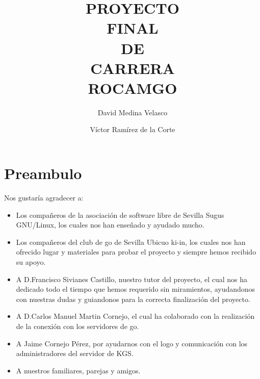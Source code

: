 \documentclass[12pt,a4paper]{report}
\begin{document}

\title{PROYECTO\\ FINAL\\ DE \\CARRERA \\ ROCAMGO\\}
\author{David Medina Velasco \and Víctor Ramírez de la Corte}
\maketitle

\marginsize{3cm}{2cm}{2cm}{2cm} %
\tableofcontents  %

 
\chapter*{Preambulo} 

Nos gustaría agradecer a: 
\begin{itemize} 
    \item Los compañeros de la asociación de software libre de Sevilla Sugus 
    GNU/Linux, los cuales nos han enseñado y ayudado mucho.  
    \item Los compañeros del club de go de Sevilla Ubicuo ki-in, los cuales nos
    han ofrecido lugar y materiales para probar el proyecto y siempre hemos 
    recibido su apoyo.  
    \item A D.Francisco Sivianes Castillo, nuestro tutor del proyecto, el cual 
    nos ha dedicado todo el tiempo que hemos requerido sin miramientos, 
    ayudandonos con nuestras dudas y guiandonos para la correcta finalización 
    del proyecto.  
    \item A D.Carlos Manuel Martin Cornejo, el cual ha colaborado con la 
    realización de la conexión con los servidores de go.  
    \item A Jaime Cornejo Pérez, por ayudarnos con el logo y comunicación con 
    los administradores del servidor de KGS.  
    \item A nuestros familiares, parejas y amigos.
\end{itemize}
\end{document}
